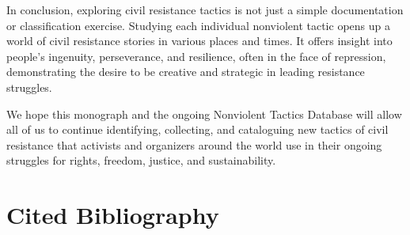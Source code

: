 \documentclass[twoside,a4paper,12pt,fleqn,openany]{extbook}
\begin{document}
In conclusion, exploring civil resistance tactics is not just a simple documentation or classification exercise. Studying each individual nonviolent tactic opens up a world of civil resistance stories in various places and times. It offers insight into people’s ingenuity, perseverance, and resilience, often in the face of repression, demonstrating the desire to be creative and strategic in leading resistance struggles.

We hope this monograph and the ongoing Nonviolent Tactics Database will allow all of us to continue identifying, collecting, and cataloguing new tactics of civil resistance that activists and organizers around the world use in their ongoing struggles for rights, freedom, justice, and sustainability.

\chapter*{Cited Bibliography}
\end{document}
